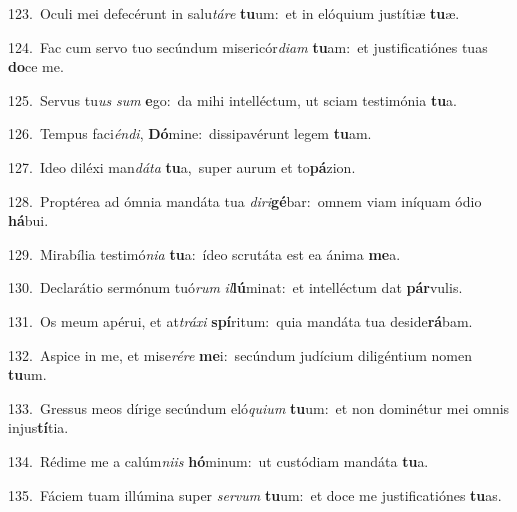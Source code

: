 {\numbfont\textcolor{\numbcolor}{123.}}~Oculi mei defecérunt in salu\-\textit{tá}\-\textit{re} \textbf{tu}\-um:~\star et in elóquium justítiæ \textbf{tu}\-æ.\par
{\numbfont\textcolor{\numbcolor}{124.}}~Fac cum servo tuo secúndum misericór\-\textit{di}\-\textit{am} \textbf{tu}\-am:~\star et justificatiónes tuas \textbf{do}\-ce me.\par
{\numbfont\textcolor{\numbcolor}{125.}}~Servus tu\textit{us} \textit{sum} \textbf{e}\-go:~\star da mihi intelléctum, ut sciam testimónia \textbf{tu}\-a.\par
{\numbfont\textcolor{\numbcolor}{126.}}~Tempus faci\-\textit{én}\-\textit{di}, \textbf{Dó}\-mine:~\star dissipavérunt legem \textbf{tu}\-am.\par
{\numbfont\textcolor{\numbcolor}{127.}}~Ideo diléxi man\-\textit{dá}\-\textit{ta} \textbf{tu}\-a,~\star super aurum et to\-\textbf{pá}\-zion.\par
{\numbfont\textcolor{\numbcolor}{128.}}~Proptérea ad ómnia mandáta tua \textit{di}\-\textit{ri}\textbf{gé}bar:~\star omnem viam iníquam ódio \textbf{há}\-bui.\par
{\numbfont\textcolor{\numbcolor}{129.}}~Mirabília testimó\-\textit{ni}\-\textit{a} \textbf{tu}\-a:~\star ídeo scrutáta est ea ánima \textbf{me}\-a.\par
{\numbfont\textcolor{\numbcolor}{130.}}~Declarátio sermónum tuó\textit{rum} \textit{il}\-\textbf{lú}minat:~\star et intelléctum dat \textbf{pár}\-vulis.\par
{\numbfont\textcolor{\numbcolor}{131.}}~Os meum apérui, et at\-\textit{trá}\-\textit{xi} \textbf{spí}\-ritum:~\star quia mandáta tua deside\-\textbf{rá}\-bam.\par
{\numbfont\textcolor{\numbcolor}{132.}}~Aspice in me, et mise\-\textit{ré}\-\textit{re} \textbf{me}\-i:~\star secúndum judícium diligéntium nomen \textbf{tu}\-um.\par
{\numbfont\textcolor{\numbcolor}{133.}}~Gressus meos dírige secúndum eló\-\textit{qui}\-\textit{um} \textbf{tu}\-um:~\star et non dominétur mei omnis injus\-\textbf{tí}\-tia.\par
{\numbfont\textcolor{\numbcolor}{134.}}~Rédime me a calúm\-\textit{ni}\-\textit{is} \textbf{hó}\-minum:~\star ut custódiam mandáta \textbf{tu}\-a.\par
{\numbfont\textcolor{\numbcolor}{135.}}~Fáciem tuam illúmina super \textit{ser}\-\textit{vum} \textbf{tu}\-um:~\star et doce me justificatiónes \textbf{tu}\-as.\par
